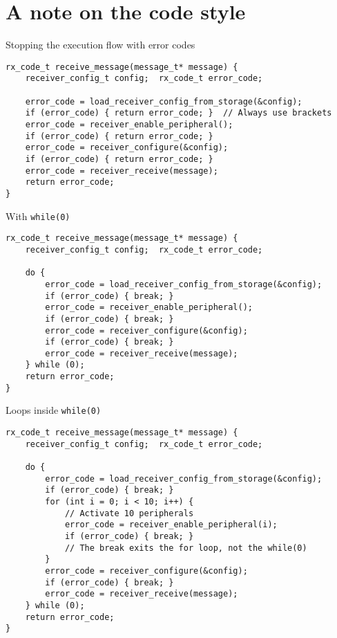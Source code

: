 \documentclass[aspectratio=169,14pt]{beamer}
\begin{document}
\section{A note on the code style}

\begin{frame}[fragile]{Stopping the execution flow with error codes}
\begin{lstlisting}[style=cstyle]
rx_code_t receive_message(message_t* message) {
    receiver_config_t config;  rx_code_t error_code;
    
    error_code = load_receiver_config_from_storage(&config);
    if (error_code) { return error_code; }  // Always use brackets
    error_code = receiver_enable_peripheral();
    if (error_code) { return error_code; }
    error_code = receiver_configure(&config);
    if (error_code) { return error_code; }
    error_code = receiver_receive(message);
    return error_code;
}
\end{lstlisting}
\end{frame}

\begin{frame}[fragile]{With \texttt{while(0)}}
\begin{lstlisting}[style=cstyle]
rx_code_t receive_message(message_t* message) {
    receiver_config_t config;  rx_code_t error_code;
    
    do {
        error_code = load_receiver_config_from_storage(&config);
        if (error_code) { break; }
        error_code = receiver_enable_peripheral();
        if (error_code) { break; }
        error_code = receiver_configure(&config);
        if (error_code) { break; }
        error_code = receiver_receive(message);
    } while (0);
    return error_code;
}
\end{lstlisting}
\end{frame}

\begin{frame}[fragile]{Loops inside \texttt{while(0)}}
\begin{lstlisting}[style=cstyle]
rx_code_t receive_message(message_t* message) {
    receiver_config_t config;  rx_code_t error_code;
    
    do {
        error_code = load_receiver_config_from_storage(&config);
        if (error_code) { break; }
        for (int i = 0; i < 10; i++) {
            // Activate 10 peripherals
            error_code = receiver_enable_peripheral(i);
            if (error_code) { break; }
            // The break exits the for loop, not the while(0)
        }
        error_code = receiver_configure(&config);
        if (error_code) { break; }
        error_code = receiver_receive(message);
    } while (0);
    return error_code;
}
\end{lstlisting}
\end{frame}
\end{document}
